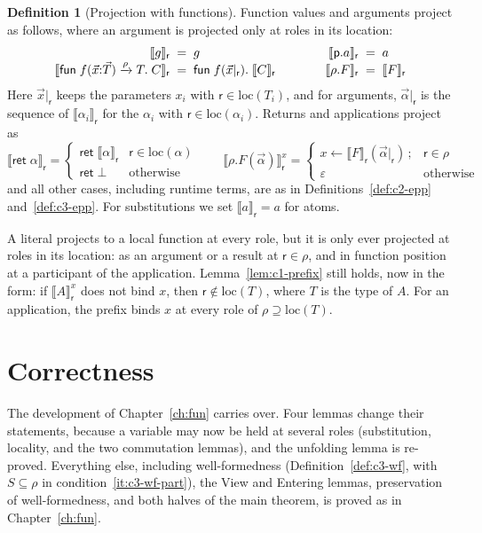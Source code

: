\documentclass[11pt]{report}
\theoremstyle{plain}
\theoremstyle{definition}
\newtheorem{definition}[theorem]{Definition}
\theoremstyle{remark}
\newcommand{\kw}[1]{\mathsf{#1}}
\newcommand{\pp}{\mathsf{p}}
\newcommand{\rr}{\mathsf{r}}
\newcommand{\cret}[1]{\kw{ret}\;#1}
\newcommand{\loc}[1]{\mathrm{loc}(#1)}
\newcommand{\nfun}[3]{\kw{fun}\;#1(#2).\;#3}
\newcommand{\proj}[2]{\llbracket #1 \rrbracket_{#2}}
\newcommand{\pre}[3]{\llbracket #1 \rrbracket^{#2}_{#3}}
\newcommand{\cfun}[5]{\kw{fun}\;#1(#2) \xrightarrow{#3} #4.\;#5}
\begin{document}
\begin{definition}[Projection with functions]\label{def:c4-epp}
  Function values and arguments project as follows, where an argument is
  projected only at roles in its location:
  \[
  \begin{array}{r@{\;\;=\;\;}l@{\qquad\qquad}r@{\;\;=\;\;}l}
    \proj{g}{\rr} & g & \proj{\pp.a}{\rr} & a\\
    \proj{\cfun{f}{\vec x{:}\vec T}{\rho}{T}{C}}{\rr} & \nfun{f}{\vec x|_\rr}{\proj{C}{\rr}} & \proj{\rho.F}{\rr} & \proj{F}{\rr}
  \end{array}
  \]
  Here $\vec x|_\rr$ keeps the parameters $x_i$ with $\rr\in\loc{T_i}$, and for
  arguments, $\vec\alpha|_\rr$ is the sequence of $\proj{\alpha_i}{\rr}$ for the
  $\alpha_i$ with $\rr\in\loc{\alpha_i}$.  Returns and applications project as
  \[
  \proj{\cret{\alpha}}{\rr} =
    \begin{cases}
      \kw{ret}\;\proj{\alpha}{\rr} & \rr\in\loc{\alpha}\\
      \kw{ret}\;\bot & \text{otherwise}
    \end{cases}
  \qquad
  \pre{\rho.F(\vec\alpha)}{x}{\rr} =
    \begin{cases}
      x\leftarrow\proj{F}{\rr}(\vec\alpha|_\rr)\,; & \rr\in\rho\\
      \varepsilon & \text{otherwise}
    \end{cases}
  \]
  and all other cases, including runtime terms, are as in
  Definitions~\ref{def:c2-epp} and~\ref{def:c3-epp}.  For substitutions we set
  $\proj{a}{\rr}=a$ for atoms.
\end{definition}

A literal projects to a local function at every role, but it is only ever
projected at roles in its location: as an argument or a result at $\rr\in\rho$,
and in function position at a participant of the application.
Lemma~\ref{lem:c1-prefix} still holds, now in the form: if
$\pre{A}{x}{\rr}$ does not bind $x$, then $\rr\notin\loc{T}$, where $T$ is the
type of $A$.  For an application, the prefix binds $x$ at every role of
$\rho\supseteq\loc{T}$.

\section{Correctness}
\label{sec:c4-correct}

The development of Chapter~\ref{ch:fun} carries over.  Four lemmas change
their statements, because a variable may now be held at several roles
(substitution, locality, and the two commutation lemmas), and the unfolding
lemma is re-proved.  Everything else, including
well-formedness (Definition~\ref{def:c3-wf}, with $S\subseteq\rho$ in
condition~\ref{it:c3-wf-part}), the View and Entering lemmas, preservation of
well-formedness, and both halves of the main theorem, is proved as in
Chapter~\ref{ch:fun}.
\end{document}

